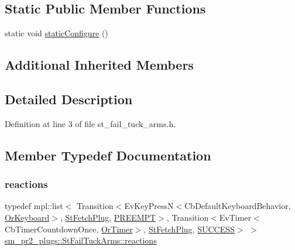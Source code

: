 \subsection*{Static Public Member Functions}
\begin{DoxyCompactItemize}
\item 
static void \hyperlink{structsm__pr2__plugs_1_1StFailTuckArms_ac23b79659008da8001dfe46ce7e0e8b7}{static\+Configure} ()
\end{DoxyCompactItemize}
\subsection*{Additional Inherited Members}


\subsection{Detailed Description}


Definition at line 3 of file st\+\_\+fail\+\_\+tuck\+\_\+arms.\+h.



\subsection{Member Typedef Documentation}
\mbox{\label{structsm__pr2__plugs_1_1StFailTuckArms_a722dbc85911ba3976f94bbc08eb06eac}} 
\subsubsection{\texorpdfstring{reactions}{reactions}}
{\footnotesize\ttfamily typedef mpl\+::list$<$ Transition$<$Ev\+Key\+PressN$<$Cb\+Default\+Keyboard\+Behavior, \hyperlink{classsm__pr2__plugs_1_1OrKeyboard}{Or\+Keyboard}$>$, \hyperlink{structsm__pr2__plugs_1_1StFetchPlug}{St\+Fetch\+Plug}, \hyperlink{classPREEMPT}{P\+R\+E\+E\+M\+PT}$>$, Transition$<$Ev\+Timer$<$Cb\+Timer\+Countdown\+Once, \hyperlink{classsm__pr2__plugs_1_1OrTimer}{Or\+Timer}$>$, \hyperlink{structsm__pr2__plugs_1_1StFetchPlug}{St\+Fetch\+Plug}, \hyperlink{classSUCCESS}{S\+U\+C\+C\+E\+SS}$>$ $>$ \hyperlink{structsm__pr2__plugs_1_1StFailTuckArms_a722dbc85911ba3976f94bbc08eb06eac}{sm\+\_\+pr2\+\_\+plugs\+::\+St\+Fail\+Tuck\+Arms\+::reactions}}



